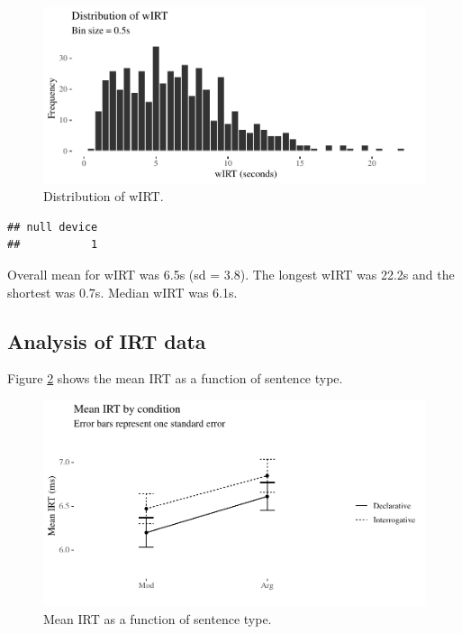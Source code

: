 \documentclass[12pt,oneside]{book}
\begin{document}
\begin{figure}
\centering
\includegraphics{4-results_files/figure-latex/wIRT-1.pdf}
\caption{\label{fig:wIRT}Distribution of wIRT.}
\end{figure}

\begin{verbatim}
## null device 
##           1
\end{verbatim}

Overall mean for wIRT was 6.5s (sd = 3.8). The longest wIRT was 22.2s and the shortest was 0.7s. Median wIRT was 6.1s.

\hypertarget{irtRes}{%
\subsection{Analysis of IRT data}\label{irtRes}}

Figure \ref{fig:interactionplot} shows the mean IRT as a function of sentence type.

\begin{figure}
\centering
\includegraphics{4-results_files/figure-latex/interactionplot-1.pdf}
\caption{\label{fig:interactionplot}Mean IRT as a function of sentence type.}
\end{figure}
\end{document}
